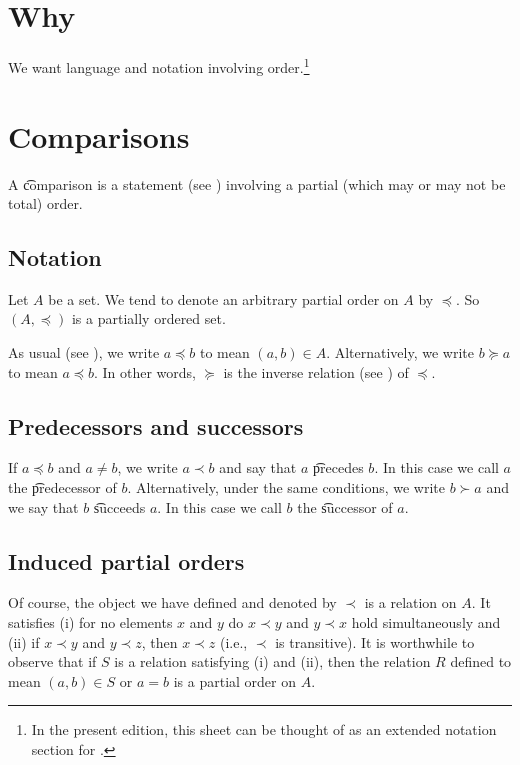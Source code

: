 
\section*{Why}

We want language and notation involving order.\footnote{In the present edition, this sheet can be thought of as an extended notation section for .}

\section*{Comparisons}

A \t{comparison} is a statement (see ) involving a partial (which may or may not be total) order.

\subsection*{Notation}

Let $A$ be a set.
We tend to denote an arbitrary partial order on $A$ by $\preceq$.
So $(A, \preceq)$ is a partially ordered set.

As usual (see ), we write $a \preceq b$ to mean $(a, b) \in A$.
Alternatively, we write $b \succeq a$ to mean $a \preceq b$.
In other words, $\succeq$ is the inverse relation (see ) of $\preceq$.

\subsection*{Predecessors and successors}

If $a \preceq b$ and $a \neq b$, we write $a \prec b$ and say that $a$ \t{precedes} $b$.
In this case we call $a$ the \t{predecessor} of $b$.
Alternatively, under the same conditions, we write $b \succ a$ and we say that $b$ \t{succeeds} $a$.
In this case we call $b$ the \t{successor} of $a$.

\subsection*{Induced partial orders}

Of course, the object we have defined and denoted by $\prec$ is a relation on $A$.
It satisfies (i) for no elements $x$ and $y$ do $x \prec y$ and $y \prec x$ hold simultaneously and (ii) if $x \prec y$ and $y \prec z$, then $x \prec z$ (i.e., $\prec$ is transitive).
It is worthwhile to observe that if $S$ is a relation satisfying (i) and (ii), then the relation $R$ defined to mean $(a, b) \in S$ or $a = b$ is a partial order on $A$.


